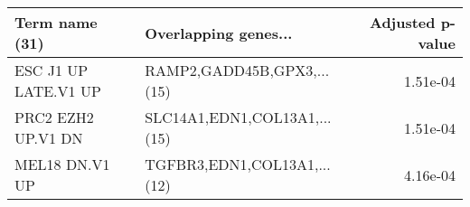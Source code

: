 \begin{tabular}{llr}
\toprule
      Term name (31) &         Overlapping genes... &  Adjusted p-value \\
\midrule
ESC J1 UP LATE.V1 UP &   RAMP2,GADD45B,GPX3,...(15) &          1.51e-04 \\
  PRC2 EZH2 UP.V1 DN & SLC14A1,EDN1,COL13A1,...(15) &          1.51e-04 \\
      MEL18 DN.V1 UP &  TGFBR3,EDN1,COL13A1,...(12) &          4.16e-04 \\
\bottomrule
\end{tabular}
